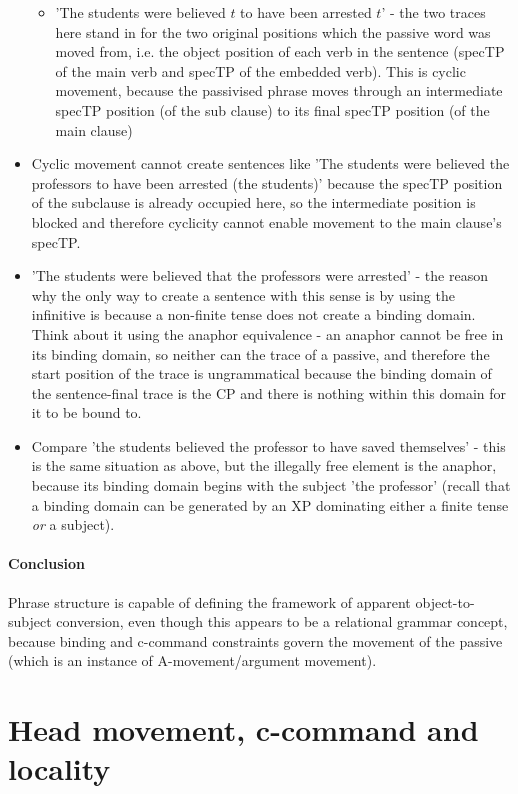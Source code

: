 \documentclass{article}
\begin{document}
\begin{itemize}
    \begin{itemize}
        \item 'The students were believed $t$ to have been arrested $t$' - the two traces here stand in for the two original positions which the passive word was moved from, i.e. the object position of each verb in the sentence (specTP of the main verb and specTP of the embedded verb). This is cyclic movement, because the passivised phrase moves through an intermediate specTP position (of the sub clause) to its final specTP position (of the main clause)
    \end{itemize}
    \item Cyclic movement cannot create sentences like 'The students were believed the professors to have been arrested (the students)' because the specTP position of the subclause is already occupied here, so the intermediate position is blocked and therefore cyclicity cannot enable movement to the main clause's specTP.
    \item 'The students were believed that the professors were arrested' - the reason why the only way to create a sentence with this sense is by using the infinitive is because a non-finite tense does not create a binding domain. Think about it using the anaphor equivalence - an anaphor cannot be free in its binding domain, so neither can the trace of a passive, and therefore the start position of the trace is ungrammatical because the binding domain of the sentence-final trace is the CP and there is nothing within this domain for it to be bound to.
    \item Compare 'the students believed the professor to have saved themselves' - this is the same situation as above, but the illegally free element is the anaphor, because its binding domain begins with the subject 'the professor' (recall that a binding domain can be generated by an XP dominating either a finite tense \textit{or} a subject).
\end{itemize}
    \paragraph{Conclusion} Phrase structure is capable of defining the framework of apparent object-to-subject conversion, even though this appears to be a relational grammar concept, because binding and c-command constraints govern the movement of the passive (which is an instance of A-movement/argument movement).

\section{Head movement, c-command and locality}
\end{document}

